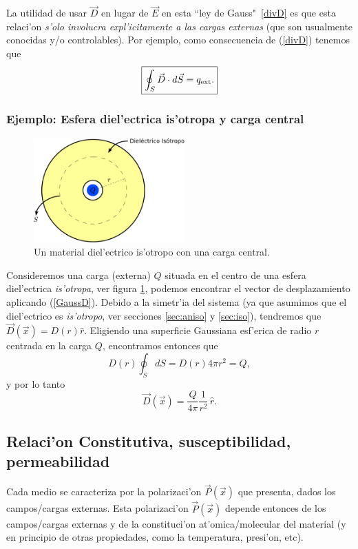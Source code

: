 La utilidad de usar $\vec{D}$ en lugar de $\vec{E}$ en esta ``ley de Gauss"
\,\eqref{divD} es que esta relaci'on \textit{s'olo involucra expl'icitamente a las cargas externas} (que son usualmente conocidas y/o controlables). Por ejemplo, como consecuencia de (\ref{divD}) tenemos que
\begin{equation}
 \boxed{\oint_S \vec{D}\cdot d\vec{S}=q_{\rm ext}.} \label{GaussD}
\end{equation}

\subsubsection{Ejemplo: Esfera diel'ectrica is'otropa y carga central}
\begin{figure}[!h]
\centerline{\includegraphics[height=4cm]{fig/fig-dielectrico-y-carga-01.pdf}}
\caption{Un material diel'ectrico is'otropo con una carga central.}
\label{diel02}
\end{figure}
Consideremos una carga (externa) $Q$ situada en el centro de una
esfera diel'ectrica \textit{is'otropa}, ver figura \ref{diel02}, podemos encontrar el vector de desplazamiento aplicando (\ref{GaussD}). Debido a la simetr'ia del sistema (ya que asumimos que el diel'ectrico es \textit{is'otropo}, ver secciones \ref{sec:aniso} y \ref{sec:iso}), tendremos que $\vec{D}(\vec{x})=D(r)\hat{r}$. Eligiendo una superficie Gaussiana esf'erica de radio $r$ centrada en la carga $Q$, encontramos entonces que
\begin{equation}
 D(r)\oint_S dS=D(r)4\pi r^2=Q,
\end{equation}
y por lo tanto
\begin{equation}
 \vec{D}(\vec{x})=\frac{Q}{4\pi}\frac{1}{r^2}\,\hat{r}.
\end{equation}


\subsection{Relaci'on Constitutiva, susceptibilidad, permeabilidad}

Cada medio se caracteriza por la polarizaci'on $\vec{P}(\vec{x})$ que presenta,
dados los campos/cargas externas. Esta polarizaci'on $\vec{P}(\vec{x})$ depende
entonces de los campos/cargas externas y de la constituci'on at'omica/molecular
del material (y en principio de otras propiedades, como la temperatura,
presi'on, etc). 

